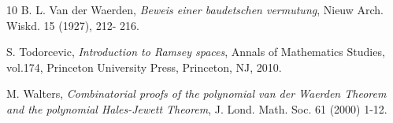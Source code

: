 \documentclass[12pt]{amsart}
\theoremstyle{plain}
\theoremstyle{definition}
\theoremstyle{remark}
\numberwithin{equation}{section}
\begin{document}
\begin{thebibliography}{10}
\vspace{.3cm}    
 B. L. Van der Waerden, \textit{Beweis einer baudetschen vermutung}, Nieuw Arch. Wiskd. 15 (1927), 212- 216.

\vspace{.3cm}
 S. Todorcevic, \textit{Introduction to Ramsey spaces}, Annals of Mathematics Studies, vol.174, Princeton University Press, Princeton, NJ, 2010.

\vspace{.3cm}
 M. Walters, \textit{Combinatorial proofs of the polynomial van der Waerden Theorem and the polynomial Hales-Jewett Theorem}, J. Lond. Math. Soc. 61 (2000) 1-12.
\vspace{.5cm}
\end{thebibliography}
\end{document}
